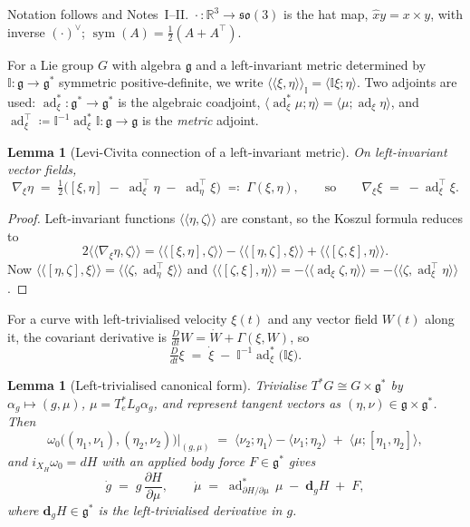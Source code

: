 \documentclass[11pt,a4paper]{article}
\newcommand{\Rm}{\mathbb{R}}
\newcommand{\Ig}{\mathbb{I}}
\newcommand{\ip}[2]{\langle\!\langle #1 , #2 \rangle\!\rangle}
\newcommand{\dpair}[2]{\langle #1 ; #2 \rangle}
\newcommand{\Dt}{\tfrac{D}{dt}}
\newcommand{\sym}{\operatorname{sym}}
\newcommand{\so}{\mathfrak{so}(3)}
\newcommand{\g}{\mathfrak{g}}
\newcommand{\ad}{\operatorname{ad}}
\newcommand{\adt}{\operatorname{ad}^{\top}}
\theoremstyle{plain}
\newtheorem{lemma}[theorem]{Lemma}
\theoremstyle{definition}
\theoremstyle{remark}
\begin{document}
Notation follows \cite{BL04} and Notes~I--II. $\hat{\cdot}:\Rm^3\to\so$ is the hat
map, $\hat x y = x\times y$, with inverse $(\cdot)^{\vee}$; $\sym(A)=\tfrac12(A+A^{\top})$.

For a Lie group $G$ with algebra $\g$ and a left-invariant metric determined by
$\Ig:\g\to\g^{*}$ symmetric positive-definite, we write
$\ip{\xi}{\eta}_{\Ig} = \dpair{\Ig\xi}{\eta}$. Two adjoints are used:
$\ad^{*}_{\xi}:\g^{*}\to\g^{*}$ is the algebraic coadjoint,
$\dpair{\ad^{*}_{\xi}\mu}{\eta} = \dpair{\mu}{\ad_{\xi}\eta}$, and
$\adt_{\xi} \coloneqq \Ig^{-1}\ad^{*}_{\xi}\Ig : \g\to\g$ is the \emph{metric}
adjoint.

\begin{lemma}[Levi-Civita connection of a left-invariant metric]
\label{lem:LC}
On left-invariant vector fields,
\begin{equation}
  \nabla_{\xi}\eta \;=\; \tfrac12\Big( [\xi,\eta] \;-\; \adt_{\xi}\eta \;-\; \adt_{\eta}\xi \Big)
  \;\eqqcolon\; \Gamma(\xi,\eta),
  \qquad\text{so}\qquad
  \nabla_{\xi}\xi \;=\; -\adt_{\xi}\xi .
  \label{eq:LC}
\end{equation}
\end{lemma}

\begin{proof}
Left-invariant functions $\ip{\eta}{\zeta}$ are constant, so the Koszul formula
reduces to
\[
  2\ip{\nabla_{\xi}\eta}{\zeta}
  = \ip{[\xi,\eta]}{\zeta} - \ip{[\eta,\zeta]}{\xi} + \ip{[\zeta,\xi]}{\eta}.
\]
Now $\ip{[\eta,\zeta]}{\xi} = \ip{\zeta}{\adt_{\eta}\xi}$ and
$\ip{[\zeta,\xi]}{\eta} = -\ip{\ad_{\xi}\zeta}{\eta} = -\ip{\zeta}{\adt_{\xi}\eta}$.
\end{proof}

For a curve with left-trivialised velocity $\xi(t)$ and any vector field $W(t)$
along it, the covariant derivative is $\Dt W = \dot W + \Gamma(\xi,W)$, so
\begin{equation}
  \Dt \xi \;=\; \dot\xi \;-\; \Ig^{-1}\ad^{*}_{\xi}\big(\Ig\xi\big).
  \label{eq:covaccel}
\end{equation}

\begin{lemma}[Left-trivialised canonical form]
\label{lem:triv}
Trivialise $T^{*}G \cong G\times\g^{*}$ by $\alpha_g \mapsto (g,\mu)$,
$\mu = T^{*}_eL_g\alpha_g$, and represent tangent vectors as $(\eta,\nu)\in\g\times\g^{*}$.
Then
\begin{equation}
  \omega_0\big((\eta_1,\nu_1),(\eta_2,\nu_2)\big)\Big|_{(g,\mu)}
  \;=\; \dpair{\nu_2}{\eta_1} - \dpair{\nu_1}{\eta_2} \;+\; \dpair{\mu}{[\eta_1,\eta_2]} ,
  \label{eq:omega-triv}
\end{equation}
and $i_{X_H}\omega_0 = dH$ with an applied body force $F\in\g^{*}$ gives
\begin{equation}
  \dot g \;=\; g\,\frac{\partial H}{\partial \mu},
  \qquad
  \dot\mu \;=\; \ad^{*}_{\partial H/\partial\mu}\,\mu \;-\; \mathbf{d}_gH \;+\; F ,
  \label{eq:LiePoisson}
\end{equation}
where $\mathbf{d}_gH\in\g^{*}$ is the left-trivialised derivative in $g$.
\end{lemma}
\end{document}
